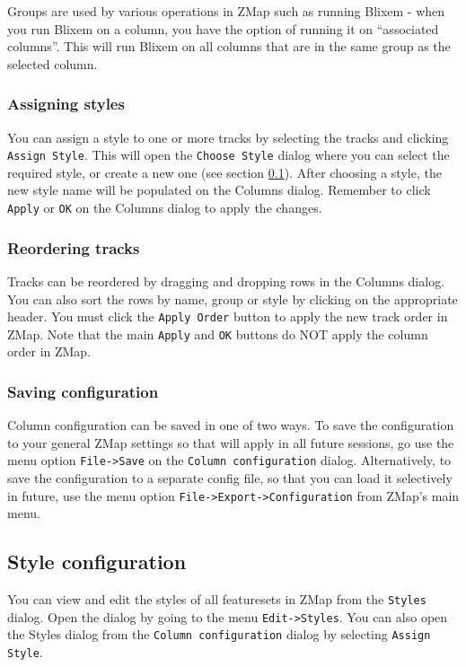\documentclass[letterpaper]{article}
\begin{document}
Groups are used by various operations in ZMap such as running Blixem - when you run Blixem on a column, you have the option of running it on ``associated columns''. This will run Blixem on all columns that are in the same group as the selected column.

\subsubsection{Assigning styles}
You can assign a style to one or more tracks by selecting the tracks and clicking \lstinline{Assign Style}. This will open the \lstinline{Choose Style} dialog where you can select the required style, or create a new one (see section \ref{sec_style_configuration}). After choosing a style, the new style name will be populated on the Columns dialog. Remember to click \lstinline{Apply} or \lstinline{OK} on the Columns dialog to apply the changes.

\subsubsection{Reordering tracks}
Tracks can be reordered by dragging and dropping rows in the Columns dialog. You can also sort the rows by name, group or style by clicking on the appropriate header. You must click the \lstinline{Apply Order} button to apply the new track order in ZMap. Note that the main \lstinline{Apply} and \lstinline{OK} buttons do NOT apply the column order in ZMap.

\subsubsection{Saving configuration}
Column configuration can be saved in one of two ways. To save the configuration to your general ZMap settings so that will apply in all future sessions, go use the menu option \lstinline{File->Save} on the \lstinline{Column configuration} dialog. Alternatively, to save the configuration to a separate config file, so that you can load it selectively in future, use the menu option \lstinline{File->Export->Configuration} from ZMap's main menu.


\subsection{Style configuration} \label{sec_style_configuration}
You can view and edit the styles of all featuresets in ZMap from the \lstinline{Styles} dialog. Open the dialog by going to the menu \lstinline{Edit->Styles}. You can also open the Styles dialog from the \lstinline{Column configuration} dialog by selecting \lstinline{Assign Style}.
\end{document}
